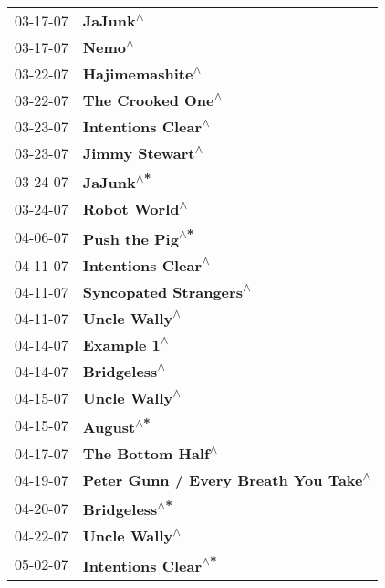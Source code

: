 \begin{supertabular}{p{0.25\columnwidth}p{0.75\columnwidth}}
 03-17-07 &                              \textbf{JaJunk\textsuperscript{$\wedge$}} \\
 03-17-07 &                                \textbf{Nemo\textsuperscript{$\wedge$}} \\
 03-22-07 &                       \textbf{Hajimemashite\textsuperscript{$\wedge$}} \\
 03-22-07 &                     \textbf{The Crooked One\textsuperscript{$\wedge$}} \\
 03-23-07 &                    \textbf{Intentions Clear\textsuperscript{$\wedge$}} \\
 03-23-07 &                       \textbf{Jimmy Stewart\textsuperscript{$\wedge$}} \\
 03-24-07 &                             \textbf{JaJunk\textsuperscript{$\wedge$*}} \\
 03-24-07 &                         \textbf{Robot World\textsuperscript{$\wedge$}} \\
 04-06-07 &                       \textbf{Push the Pig\textsuperscript{$\wedge$*}} \\
 04-11-07 &                    \textbf{Intentions Clear\textsuperscript{$\wedge$}} \\
 04-11-07 &                \textbf{Syncopated Strangers\textsuperscript{$\wedge$}} \\
 04-11-07 &                         \textbf{Uncle Wally\textsuperscript{$\wedge$}} \\
 04-14-07 &                           \textbf{Example 1\textsuperscript{$\wedge$}} \\
 04-14-07 &                          \textbf{Bridgeless\textsuperscript{$\wedge$}} \\
 04-15-07 &                         \textbf{Uncle Wally\textsuperscript{$\wedge$}} \\
 04-15-07 &                             \textbf{August\textsuperscript{$\wedge$*}} \\
 04-17-07 &                     \textbf{The Bottom Half\textsuperscript{$\wedge$}} \\
 04-19-07 &  \textbf{Peter Gunn / Every Breath You Take\textsuperscript{$\wedge$}} \\
 04-20-07 &                         \textbf{Bridgeless\textsuperscript{$\wedge$*}} \\
 04-22-07 &                         \textbf{Uncle Wally\textsuperscript{$\wedge$}} \\
 05-02-07 &                   \textbf{Intentions Clear\textsuperscript{$\wedge$*}} \\

\end{supertabular}
